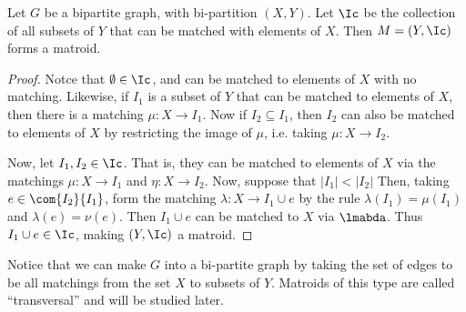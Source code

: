 \begin{lemma}\label{1.1.6}
    Let $G$ be a bipartite graph, with bi-partition  $(X,Y)$. Let $\Ic$ be the
    collection of all subsets of  $Y$ that can be matched with elements of  $X$.
    Then $M=(Y, \Ic)$ forms a matroid.
\end{lemma}
\begin{proof}
    Notce that $\emptyset \in \Ic$, and can be matched to elements of  $X$ with
    no matching. Likewise, if $I_1$ is a subset of $Y$ that can be matched to
    elements of  $X$, then there is a matching  $\mu:X \rightarrow I_1$. Now if
    $I_2 \subseteq I_1$, then $I_2$ can also be matched to elements of $X$ by
    restricting the image of $\mu$, i.e. taking  $\mu:X \rightarrow I_2$.

    Now, let $I_1, I_2 \in \Ic$. That is, they can be matched to elements of $X$
    via the matchings  $\mu:X \rightarrow I_1$ and $\eta:X \rightarrow I_2$. Now,
    suppose that $|I_1|<|I_2|$ Then, taking $e \in \com{I_2}{I_1}$, form the
    matching $\lambda:X \rightarrow I_1 \cup e$ by the rule
    $\lambda(I_1)=\mu(I_1)$ and $\lambda(e)=\nu(e)$. Then $I_1 \cup e$ can be
    matched to $X$ via  $\lmabda$. Thus  $I_1 \cup e \in \Ic$, making $(Y,\Ic)$
    a matroid.
\end{proof}
\begin{remark}
    Notice that we can make $G$ into a bi-partite graph by taking the set of
    edges to be all matchings from the set  $X$ to subsets of  $Y$. Matroids of
    this type are called ``transversal'' and will be studied later.
\end{remark}
